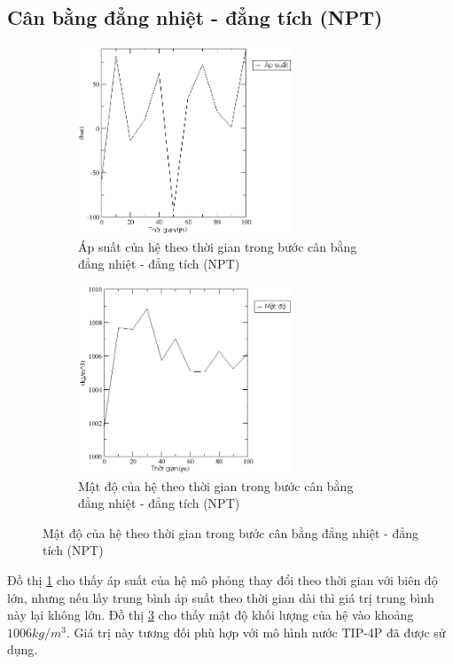 \documentclass[12pt,a4paper,reqno, oneside]{book}
\begin{document}
	\subsection{Cân bằng đẳng nhiệt - đẳng tích (NPT)}
	\begin{figure}[h]
	\centering
	\begin{subfigure}{0.45\textheight}
	\centering
	\includegraphics[width=0.7\textwidth,natwidth=610,natheight=642]{25pressure2}
	\caption{Áp suất của hệ theo thời gian trong bước cân bằng đẳng nhiệt - đẳng tích (NPT)}
	\label{fig:pressure}
	\end{subfigure}
	\begin{subfigure}{0.45\textheight}
	\centering
	\includegraphics[width=0.7\textwidth,natwidth=610,natheight=642]{25density2}
	\caption{Mật độ của hệ theo thời gian trong bước cân bằng đẳng nhiệt - đẳng tích (NPT)}
	\label{fig:density}
	\end{subfigure}
	\end{figure}
	Đồ thị \ref{fig:pressure} cho thấy áp suất của hệ mô phỏng thay đổi theo thời gian với biên độ lớn, nhưng nếu lấy trung bình áp suất theo thời gian dài thì giá trị trung bình này lại không lớn. Đồ thị \ref{fig:density} cho thấy mật độ khối lượng của hệ vào khoảng $1006 kg/m^{3}$. Giá trị này tương đối phù hợp với mô hình nước TIP-4P\cite{Horn2004} đã được sử dụng.
\end{document}
